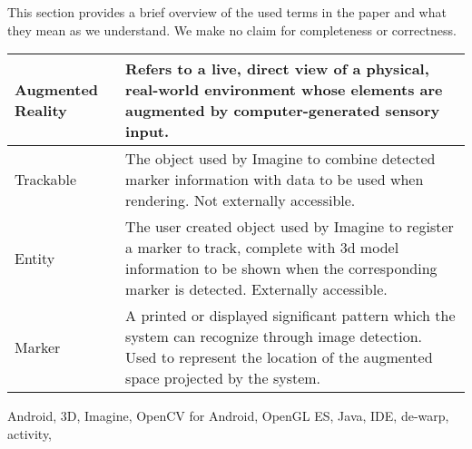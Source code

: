 This section provides a brief overview of the used terms in the paper and what they mean as we understand.
We make no claim for completeness or correctness.

\begin{tabulary}{\textwidth}{L|L}
Augmented Reality & Refers to a live, direct view of a physical, real-world environment whose elements are augmented by computer-generated sensory input\protect \cite{ardef}. \\
\hline
Trackable & The object used by Imagine to combine detected marker information with data to be used when rendering. Not externally accessible.\\
\hline
Entity & The user created object used by Imagine to register a marker to track, complete with 3d model information to be shown when the corresponding marker is detected. Externally accessible.\\
\hline
Marker & A printed or displayed significant pattern which the system can recognize through image detection. Used to represent the location of the augmented space projected by the system. \\
\end{tabulary}

Android, 3D, Imagine, OpenCV for Android, OpenGL ES, Java, IDE, de-warp, activity, 
